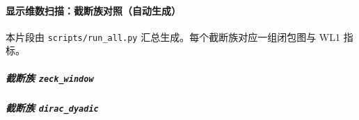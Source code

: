 \paragraph{显示维数扫描：截断族对照（自动生成）}
\AuditTag 本片段由 \texttt{scripts/run\_all.py} 汇总生成。每个截断族对应一组闭包图与 WL1 指标。
\subparagraph{截断族 \texttt{zeck\_window}}

\begin{center}\scriptsize

\end{center}


\subparagraph{截断族 \texttt{dirac\_dyadic}}

\begin{center}\scriptsize

\end{center}


